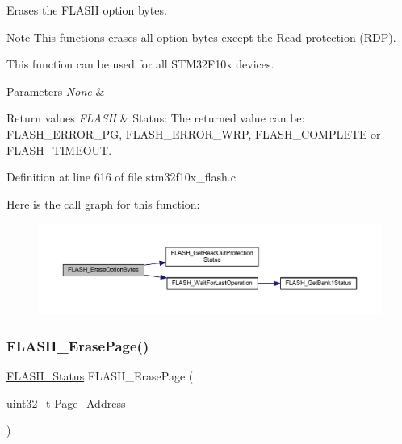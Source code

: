 Erases the F\+L\+A\+SH option bytes. 

\begin{DoxyNote}{Note}
This functions erases all option bytes except the Read protection (R\+DP). 

This function can be used for all S\+T\+M32\+F10x devices. 
\end{DoxyNote}

\begin{DoxyParams}{Parameters}
{\em None} & \\
\hline
\end{DoxyParams}

\begin{DoxyRetVals}{Return values}
{\em F\+L\+A\+SH} & Status\+: The returned value can be\+: F\+L\+A\+S\+H\+\_\+\+E\+R\+R\+O\+R\+\_\+\+PG, F\+L\+A\+S\+H\+\_\+\+E\+R\+R\+O\+R\+\_\+\+W\+RP, F\+L\+A\+S\+H\+\_\+\+C\+O\+M\+P\+L\+E\+TE or F\+L\+A\+S\+H\+\_\+\+T\+I\+M\+E\+O\+UT. \\
\hline
\end{DoxyRetVals}


Definition at line 616 of file stm32f10x\+\_\+flash.\+c.

Here is the call graph for this function\+:
\nopagebreak
\begin{figure}[H]
\begin{center}
\leavevmode
\includegraphics[width=350pt]{group___f_l_a_s_h___private___functions_ga152768609e85d74a9d8474be8dc2874b_cgraph}
\end{center}
\end{figure}
\mbox{\label{group___f_l_a_s_h___private___functions_ga13a2ca18bfb3d5fb827a2751799f8451}} 
\subsubsection{\texorpdfstring{F\+L\+A\+S\+H\+\_\+\+Erase\+Page()}{FLASH\_ErasePage()}}
{\footnotesize\ttfamily \hyperlink{group___f_l_a_s_h___exported___types_gadc63a6f3404ff1f71229a66915e9cdc0}{F\+L\+A\+S\+H\+\_\+\+Status} F\+L\+A\+S\+H\+\_\+\+Erase\+Page (\begin{DoxyParamCaption}\item[{uint32\+\_\+t}]{Page\+\_\+\+Address }\end{DoxyParamCaption})}



